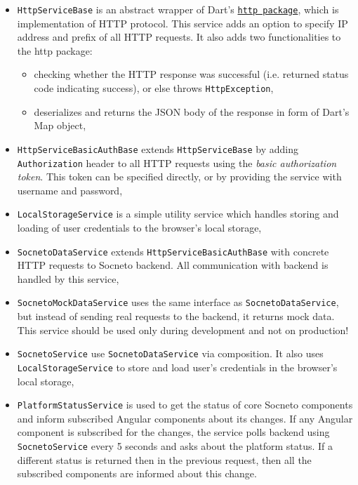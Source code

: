 \begin{itemize}
    \item \texttt{HttpServiceBase} is an abstract wrapper of Dart's \texttt{\href{https://pub.dev/packages/http}{http package}}, which is implementation of HTTP protocol. This service adds an option to specify IP address and prefix of all HTTP requests. It also adds two functionalities to the http package:
    \begin{itemize}
        \item checking whether the HTTP response was successful (i.e. returned status code indicating success), or else throws \texttt{HttpException},
        \item deserializes and returns the JSON body of the response in form of Dart's Map object,
    \end{itemize}
    
    \item \texttt{HttpServiceBasicAuthBase} extends \texttt{HttpServiceBase} by adding \texttt{Autho\-rization} header to all HTTP requests using the \textit{basic authorization token}. This token can be specified directly, or by providing the service with username and password,
    
    \item \texttt{LocalStorageService} is a simple utility service which handles storing and loading of user credentials to the browser's local storage,
    
    \item \texttt{SocnetoDataService} extends \texttt{HttpServiceBasicAuthBase} with concrete HTTP requests to Socneto backend. All communication with backend is handled by this service,
    
    \item \texttt{SocnetoMockDataService} uses the same interface as \texttt{SocnetoDataService}, but instead of sending real requests to the backend, it returns mock data. This service should be used only during development and not on production!
    
    \item \texttt{SocnetoService} use \texttt{SocnetoDataService} via composition. It also uses \\ \texttt{LocalStorageService} to store and load user's credentials in the browser's local storage,
    
    \item \texttt{PlatformStatusService} is used to get the status of core Socneto components and inform subscribed Angular components about its changes. If any Angular component is subscribed for the changes, the service polls backend using \texttt{SocnetoService} every 5 seconds and asks about the platform status. If a different status is returned then in the previous request, then all the subscribed components are informed about this change.
    
\end{itemize}

